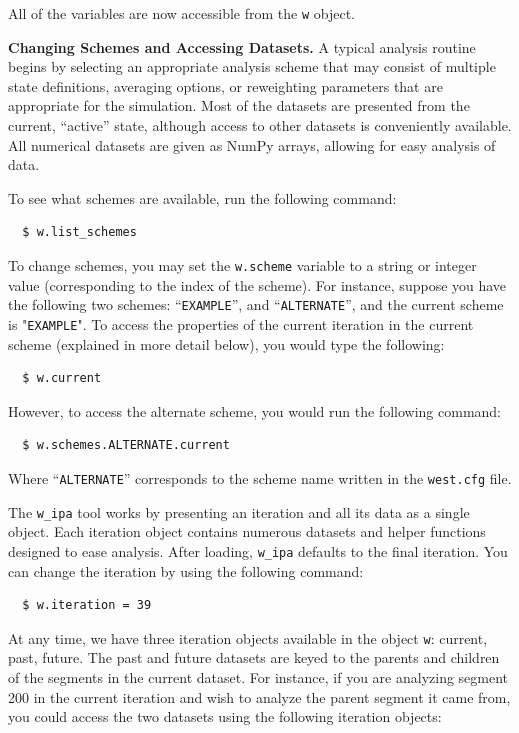 All of the variables are now accessible from the \verb|w| object.

\textbf{Changing Schemes and Accessing Datasets.} A typical analysis routine begins by selecting an appropriate analysis scheme that may consist of multiple state definitions, averaging options, or reweighting parameters that are appropriate for the simulation. 
Most of the datasets are presented from the current, “active” state, although access to other datasets is conveniently available. 
All numerical datasets are given as NumPy arrays, allowing for easy analysis of data.

To see what schemes are available, run the following command:

\begin{verbatim}
  $ w.list_schemes
\end{verbatim}

To change schemes, you may set the \verb|w.scheme| variable to a string or integer value (corresponding to the index of the scheme). 
For instance, suppose you have the following two schemes: “\verb|EXAMPLE|”, and “\verb|ALTERNATE|”, and the current scheme is "\verb|EXAMPLE|". 
To access the properties of the current iteration in the current scheme (explained in more detail below), you would type the following:
\begin{verbatim}
  $ w.current
\end{verbatim}

However, to access the alternate scheme, you would run the following command:
\begin{verbatim}
  $ w.schemes.ALTERNATE.current
\end{verbatim}

Where “\verb|ALTERNATE|” corresponds to the scheme name written in the \verb|west.cfg| file.

The \verb|w_ipa| tool works by presenting an iteration and all its data as a single object. Each iteration object contains numerous datasets and helper functions designed to ease analysis. 
After loading, \verb|w_ipa| defaults to the final iteration. 
You can change the iteration by using the following command: 
\begin{verbatim}
  $ w.iteration = 39
\end{verbatim}

At any time, we have three iteration objects available in the object \verb|w|: current, past, future. 
The past and future datasets are keyed to the parents and children of the segments in the current dataset. 
For instance, if you are analyzing segment 200 in the current iteration and wish to analyze the parent segment it came from, you could access the two datasets using the following iteration objects:

